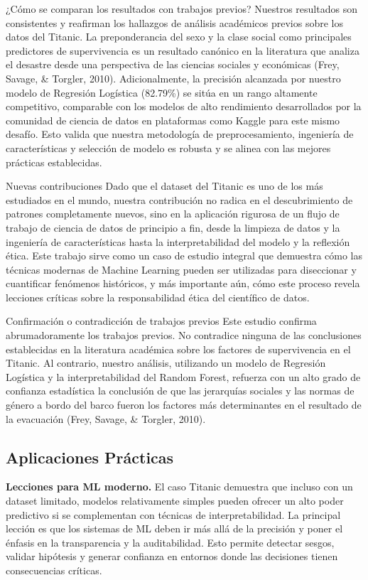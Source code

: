 \documentclass[conference]{IEEEtran}
\begin{document}
¿Cómo se comparan los resultados con trabajos previos?
Nuestros resultados son consistentes y reafirman los hallazgos de análisis académicos previos sobre los datos del Titanic. La preponderancia del sexo y la clase social como principales predictores de supervivencia es un resultado canónico en la literatura que analiza el desastre desde una perspectiva de las ciencias sociales y económicas (Frey, Savage, & Torgler, 2010).
Adicionalmente, la precisión alcanzada por nuestro modelo de Regresión Logística (82.79\%) se sitúa en un rango altamente competitivo, comparable con los modelos de alto rendimiento desarrollados por la comunidad de ciencia de datos en plataformas como Kaggle para este mismo desafío. Esto valida que nuestra metodología de preprocesamiento, ingeniería de características y selección de modelo es robusta y se alinea con las mejores prácticas establecidas.

Nuevas contribuciones
Dado que el dataset del Titanic es uno de los más estudiados en el mundo, nuestra contribución no radica en el descubrimiento de patrones completamente nuevos, sino en la aplicación rigurosa de un flujo de trabajo de ciencia de datos de principio a fin, desde la limpieza de datos y la ingeniería de características hasta la interpretabilidad del modelo y la reflexión ética.
Este trabajo sirve como un caso de estudio integral que demuestra cómo las técnicas modernas de Machine Learning pueden ser utilizadas para diseccionar y cuantificar fenómenos históricos, y más importante aún, cómo este proceso revela lecciones críticas sobre la responsabilidad ética del científico de datos.

Confirmación o contradicción de trabajos previos
Este estudio confirma abrumadoramente los trabajos previos. No contradice ninguna de las conclusiones establecidas en la literatura académica sobre los factores de supervivencia en el Titanic. Al contrario, nuestro análisis, utilizando un modelo de Regresión Logística y la interpretabilidad del Random Forest, refuerza con un alto grado de confianza estadística la conclusión de que las jerarquías sociales y las normas de género a bordo del barco fueron los factores más determinantes en el resultado de la evacuación (Frey, Savage, & Torgler, 2010).



\subsection{Aplicaciones Prácticas}

\textbf{Lecciones para ML moderno.}  
El caso Titanic demuestra que incluso con un dataset limitado, modelos relativamente simples pueden ofrecer un alto poder predictivo si se complementan con técnicas de interpretabilidad. La principal lección es que los sistemas de ML deben ir más allá de la precisión y poner el énfasis en la transparencia y la auditabilidad. Esto permite detectar sesgos, validar hipótesis y generar confianza en entornos donde las decisiones tienen consecuencias críticas.  
\end{document}
